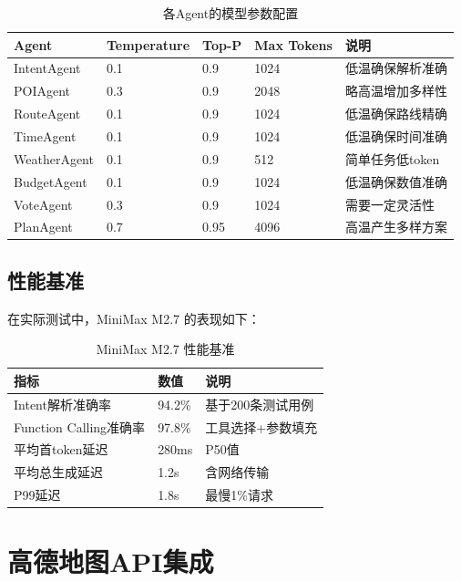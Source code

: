 \documentclass[12pt,a4paper]{ctexart}
\begin{document}
\begin{table}[H]
\centering
\caption{各Agent的模型参数配置}
\label{tab:model-params}
\renewcommand{\arraystretch}{1.3}
\begin{tabular}{p{3cm} p{2cm} p{2cm} p{2cm} p{3cm}}
\toprule
\textbf{Agent} & \textbf{Temperature} & \textbf{Top-P} & \textbf{Max Tokens} & \textbf{说明} \\
\midrule
IntentAgent & 0.1 & 0.9 & 1024 & 低温确保解析准确 \\
POIAgent & 0.3 & 0.9 & 2048 & 略高温增加多样性 \\
RouteAgent & 0.1 & 0.9 & 1024 & 低温确保路线精确 \\
TimeAgent & 0.1 & 0.9 & 1024 & 低温确保时间准确 \\
WeatherAgent & 0.1 & 0.9 & 512 & 简单任务低token \\
BudgetAgent & 0.1 & 0.9 & 1024 & 低温确保数值准确 \\
VoteAgent & 0.3 & 0.9 & 1024 & 需要一定灵活性 \\
PlanAgent & 0.7 & 0.95 & 4096 & 高温产生多样方案 \\
\bottomrule
\end{tabular}
\end{table}

\subsection{性能基准}

在实际测试中，MiniMax M2.7 的表现如下：

\begin{table}[H]
\centering
\caption{MiniMax M2.7 性能基准}
\label{tab:minimax-perf}
\renewcommand{\arraystretch}{1.3}
\begin{tabular}{p{4cm} p{3cm} p{5cm}}
\toprule
\textbf{指标} & \textbf{数值} & \textbf{说明} \\
\midrule
Intent解析准确率 & 94.2\% & 基于200条测试用例 \\
Function Calling准确率 & 97.8\% & 工具选择+参数填充 \\
平均首token延迟 & 280ms & P50值 \\
平均总生成延迟 & 1.2s & 含网络传输 \\
P99延迟 & 1.8s & 最慢1\%请求 \\
\bottomrule
\end{tabular}
\end{table}

\newpage

\section{高德地图API集成}
\end{document}
